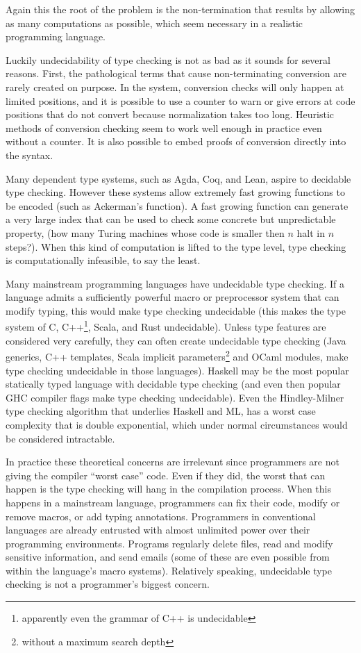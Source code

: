 Again this the root of the problem is the non-termination that results by allowing as many computations as possible, which seem necessary in a realistic programming language.

Luckily undecidability of type checking is not as bad as it sounds for several reasons.
First, the pathological terms that cause non-terminating conversion are rarely created on purpose.
In the \bidir{} system, conversion checks will only happen at limited positions, and it is possible to use a counter to warn or give errors at code positions that do not convert because normalization takes too long.
Heuristic methods of conversion checking seem to work well enough in practice even without a counter.
It is also possible to embed proofs of conversion directly into the syntax\cite{sjoberg2012irrelevance}.

Many dependent type systems, such as Agda, Coq, and Lean, aspire to decidable type checking.
However these systems allow extremely fast growing functions to be encoded (such as Ackerman's function).
A fast growing function can generate a very large index that can be used to check some concrete but unpredictable property, (how many Turing machines whose code is smaller then $n$ halt in $n$ steps?).
When this kind of computation is lifted to the type level, type checking is computationally infeasible, to say the least.


Many mainstream programming languages have undecidable type checking.
If a language admits a sufficiently powerful macro or preprocessor system that can modify typing, this would make type checking undecidable (this makes the type system of C, C++\footnote{apparently even the grammar of C++ is undecidable}, Scala, and Rust undecidable).
Unless type features are considered very carefully, they can often create undecidable type checking (Java generics, C++ templates, Scala implicit parameters\footnote{without a maximum search depth} and OCaml modules, make type checking undecidable in those languages).
Haskell may be the most popular statically typed language with decidable type checking (and even then popular GHC compiler flags make type checking undecidable).
Even the Hindley-Milner type checking algorithm that underlies Haskell and ML, has a worst case complexity that is double exponential, which under normal circumstances would be considered intractable.

In practice these theoretical concerns are irrelevant since programmers are not giving the compiler ``worst case'' code.
Even if they did, the worst that can happen is the type checking will hang in the compilation process.
When this happens in a mainstream language, programmers can fix their code, modify or remove macros, or add typing annotations.
Programmers in conventional languages are already entrusted with almost unlimited power over their programming environments.
Programs regularly delete files, read and modify sensitive information, and send emails (some of these are even possible from within the language's macro systems).
Relatively speaking, undecidable type checking is not a programmer's biggest concern.

